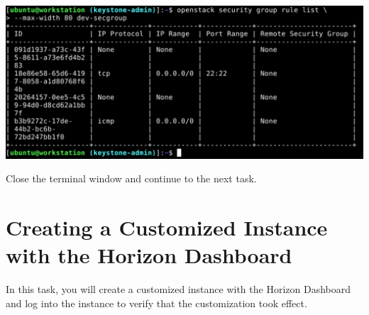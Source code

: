 \documentclass[letterpaper, 12pt]{article}
\begin{document}
\begin{enumerate}
\begin{labstep}
        \begin{center}
            \includegraphics[width=\linewidth]{images/part1/step29.png}
        \end{center}
    \end{labstep}

    \begin{labstep}
        Close the terminal window and continue to the next task.
    \end{labstep}
\end{enumerate}

\section{Creating a Customized Instance with the Horizon Dashboard}\label{sec:creating-a-customized-instance-with-the-horizon-dashboard}
In this task, you will create a customized instance with the Horizon Dashboard and log into the instance to verify that the customization took effect.
\end{document}
